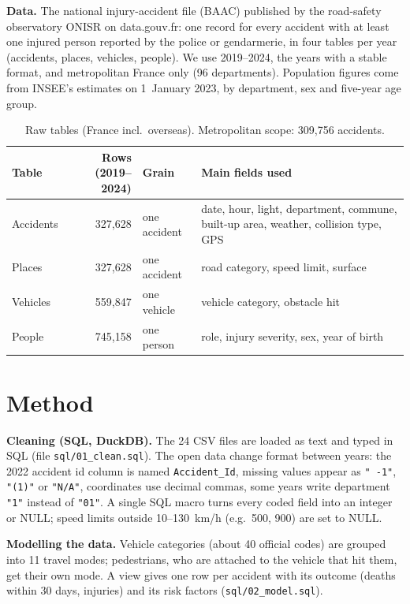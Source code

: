 \documentclass[11pt,a4paper]{article}
\begin{document}
\textbf{Data.} The national injury-accident file (BAAC) published by the road-safety observatory ONISR on
data.gouv.fr: one record for every accident with at least one injured person reported by the police or
gendarmerie, in four tables per year (accidents, places, vehicles, people). We use 2019--2024, the years
with a stable format, and metropolitan France only (96 departments). Population figures come from
INSEE's estimates on 1~January 2023, by department, sex and five-year age group.

\begin{table}[H]\centering\small
\begin{tabular}{lrlp{6.2cm}}\toprule
Table & Rows (2019--2024) & Grain & Main fields used \\\midrule
Accidents & 327{,}628 & one accident & date, hour, light, department, commune, built-up area, weather, collision type, GPS \\
Places & 327{,}628 & one accident & road category, speed limit, surface \\
Vehicles & 559{,}847 & one vehicle & vehicle category, obstacle hit \\
People & 745{,}158 & one person & role, injury severity, sex, year of birth \\\bottomrule
\end{tabular}
\caption{Raw tables (France incl.\ overseas). Metropolitan scope: 309{,}756 accidents.}
\end{table}

\section{Method}
\textbf{Cleaning (SQL, DuckDB).} The 24 CSV files are loaded as text and typed in SQL
(file \texttt{sql/01\_clean.sql}). The open data change format between years: the 2022 accident id column is named
\texttt{Accident\_\allowbreak Id}, missing values appear as \texttt{" -1"}, \texttt{"(1)"} or \texttt{"N/A"}, coordinates use
decimal commas, some years write department \texttt{"1"} instead of \texttt{"01"}. A single SQL macro turns every
coded field into an integer or NULL; speed limits outside 10--130~km/h (e.g.\ 500, 900) are set to NULL.

\textbf{Modelling the data.} Vehicle categories (about 40 official codes) are grouped into 11 travel modes;
pedestrians, who are attached to the vehicle that hit them, get their own mode. A view gives one row per
accident with its outcome (deaths within 30 days, injuries) and its risk factors (\texttt{sql/02\_model.sql}).
\end{document}
